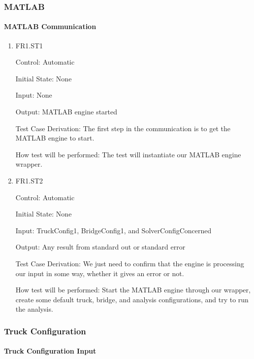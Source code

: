 \documentclass[12pt, titlepage]{article}
\begin{document}
\subsubsection{MATLAB}

\paragraph{MATLAB Communication}

\begin{enumerate}

  \item{FR1.ST1\\}

  Control: Automatic

  Initial State: None

  Input: None

  Output: MATLAB engine started

  Test Case Derivation: The first step in the communication is to get the MATLAB engine
  to start.

  How test will be performed: The test will instantiate our MATLAB engine wrapper.

  \item{FR1.ST2\\}

  Control: Automatic

  Initial State: None

  Input: TruckConfig1, BridgeConfig1, and SolverConfigConcerned

  Output: Any result from standard out or standard error

  Test Case Derivation: We just need to confirm that the engine is processing our
  input in some way, whether it gives an error or not.

  How test will be performed: Start the MATLAB engine through our wrapper, create
  some default truck, bridge, and analysis configurations, and try to run the analysis.

\end{enumerate}

\subsubsection{Truck Configuration}

\paragraph{Truck Configuration Input}
\end{document}

